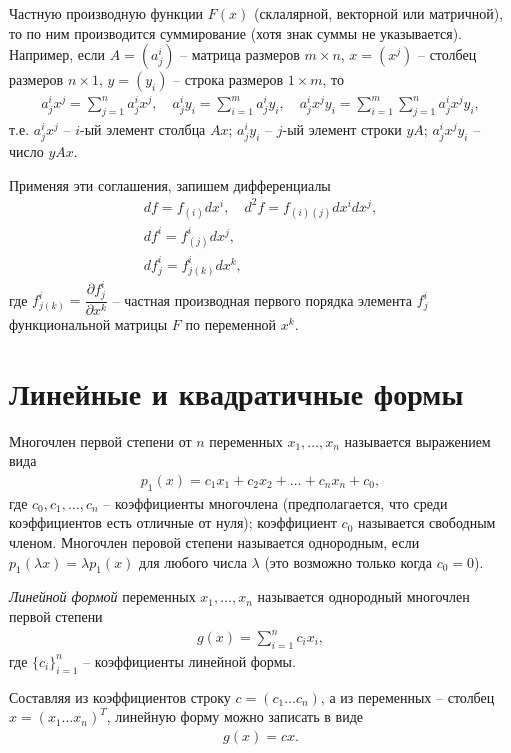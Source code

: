 \documentclass[%
	11pt,
	a4paper,
	utf8,
		]{article}
\begin{document}
Частную производную функции $ F(x) $ (склалярной, векторной или матричной), то по ним производится суммирование (хотя знак суммы не указывается). Например, если $ A = (a_j^i) $ -- матрица размеров $ m \times n $, $ x = (x^j) $ -- столбец размеров $ n \times 1 $, $ y = (y_i) $ -- строка размеров $ 1 \times m $, то
\begin{align*}
	a_j^i x^j = \sum_{j=1}^n a_j^i x^j, \quad a_j^i y_i = \sum_{i=1}^m a_j^i y_i, \quad a_j^ix^jy_i = \sum_{i=1}^m\sum_{j=1}^n a_j^i x^jy_i,
\end{align*}
т.е. $ a_j^i x^j $ -- $ i $-ый элемент столбца $ A x $; $ a_j^i y_i $ -- $ j $-ый элемент строки $ yA $; $ a_j^i x^jy_i $ -- число $ yAx $.

Применяя эти соглашения, запишем дифференциалы
\begin{align*}
	df = f_{(i)}dx^i, \quad d^2 f = f_{(i)(j)}dx^idx^j,\\
	df^i = f_{(j)}^i dx^j, \\
	df_j^i = f_{j(k)}^i dx^k,
\end{align*}
где $ f_{j(k)}^i = \dfrac{\partial f_j^i}{\partial x^k} $ -- частная производная первого порядка элемента $ f_j^i $ функциональной матрицы $ F $ по переменной $ x^k $.

\section{Линейные и квадратичные формы}

Многочлен первой степени от $ n $ переменных $ x_1, \ldots, x_n $ называется выражением вида
\begin{align*}
	p_1(x) = c_1 x_1 + c_2 x_2 + \ldots + c_n x_n + c_0,
\end{align*}
где $ c_0, c_1, \ldots, c_n $ -- коэффициенты многочлена (предполагается, что среди коэффициентов есть отличные от нуля); коэффициент $ c_0 $ называется свободным членом. Многочлен перовой степени называется однородным, если $ p_1(\lambda x) = \lambda p_1 (x) $ для любого числа $ \lambda $ (это возможно только когда $ c_0 = 0 $).

\emph{Линейной формой} переменных $ x_1, \ldots, x_n $ называется однородный многочлен первой степени
\begin{align*}
	g(x) = \sum_{i=1}^n c_i x_i,
\end{align*}
где $ \{c_i\}_{i=1}^n $ -- коэффициенты линейной формы. 

Составляя из коэффициентов строку $ c = (c_1 \ldots c_n) $, а из переменных -- столбец $ x = (x_1 \ldots x_n)^T $, линейную форму можно записать в виде
\begin{align*}
	g(x) = cx.
\end{align*}
\end{document}
